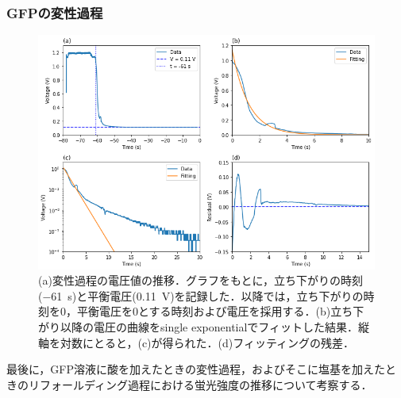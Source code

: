 \documentclass[a4paper,11pt, titlepage]{jsarticle}
\begin{document}
\subsubsection{GFPの変性過程}

\begin{figure}[htbp]
    \centering
    \includegraphics[width=14cm]{unfolding.png}
    \caption{(a)変性過程の電圧値の推移．グラフをもとに，立ち下がりの時刻(\SI{-61}{\second})と平衡電圧(\SI{0.11}{\volt})を記録した．以降では，立ち下がりの時刻を0，平衡電圧を0とする時刻および電圧を採用する．(b)立ち下がり以降の電圧の曲線をsingle exponentialでフィットした結果．縦軸を対数にとると，(c)が得られた．(d)フィッティングの残差．}
    \label{fig:unfolding}
\end{figure}

最後に，GFP溶液に酸を加えたときの変性過程，およびそこに塩基を加えたときのリフォールディング過程における蛍光強度の推移について考察する．
\end{document}
